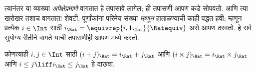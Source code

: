 \documentclass[../../../include/open-logic-section]{subfiles}
\begin{document}
त्यानंतर या व्याख्या \emph{अपेक्षेप्रमाणे} वागतात हे तपासावे लागेल;
ही तपासणी आपण  कडे सोपवतो. आणि त्या खरोखर तशाच
वागतात!{} शेवटी, पूर्णांकांना परिमेय संख्या \emph{म्हणून} हाताळण्याची
काही पद्धत हवी; म्हणून प्रत्येक $i \in \Int$ साठी $i_\Rat =
\equivrep{i, 1_\Int}{\Ratequiv}$ असे आपण ठरवतो. हे सर्व सुयोग्य रीतीने
वागते याची तपासणीही आपण  मध्ये करतो.

\begin{prob}
कोणत्याही $i, j \in \Int$ साठी $(i + j)_\Rat = i_\Rat+ j_\Rat$ आणि $(i \times j)_\Rat =
i_\Rat \times j_\Rat$ आणि $i \leq j \liff i_\Rat \leq j_\Rat$ हे दाखवा.
\end{prob}
\end{document}
